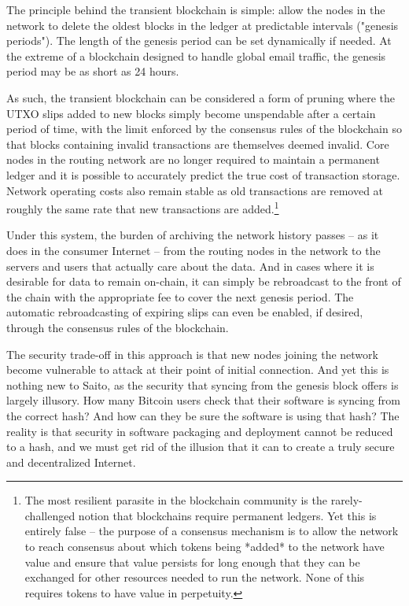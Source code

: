\documentclass[12pt, oneside]{article}   	%
\begin{document}
\begin{multicols}{2}
The principle behind the transient blockchain is simple: allow the nodes in the network to delete the oldest blocks in the ledger at predictable intervals ("genesis periods"). The length of the genesis period can be set dynamically if needed. At the extreme of a blockchain designed to handle global email traffic, the genesis period may be as short as 24 hours.

As such, the transient blockchain can be considered a form of pruning where the UTXO slips added to new blocks simply become unspendable after a certain period of time, with the limit enforced by the consensus rules of the blockchain so that blocks containing invalid transactions are themselves deemed invalid. Core nodes in the routing network are no longer required to maintain a permanent ledger and it is possible to accurately predict the true cost of transaction storage. Network operating costs also remain stable as old transactions are removed at roughly the same rate that new transactions are added.\footnote[1]{The most resilient parasite in the blockchain community is the rarely-challenged notion that blockchains require permanent ledgers. Yet this is entirely false -- the purpose of a consensus mechanism is to allow the network to reach consensus about which tokens being *added* to the network have value and ensure that value persists for long enough that they can be exchanged for other resources needed to run the network. None of this requires tokens to have value in perpetuity.}

Under this system, the burden of archiving the network history passes -- as it does in the consumer Internet -- from the routing nodes in the network to the servers and users that actually care about the data. And in cases where it is desirable for data to remain on-chain, it can simply be rebroadcast to the front of the chain with the appropriate fee to cover the next genesis period. The automatic rebroadcasting of expiring slips can even be enabled, if desired, through the consensus rules of the blockchain.

The security trade-off in this approach is that new nodes joining the network become vulnerable to attack at their point of initial connection. And yet this is nothing new to Saito, as the security that syncing from the genesis block offers is largely illusory. How many Bitcoin users check that their software is syncing from the correct hash? And how can they be sure the software is using that hash? The reality is that security in software packaging and deployment cannot be reduced to a hash, and we must get rid of the illusion that it can to create a truly secure and decentralized Internet.


\end{multicols}
\end{document}
